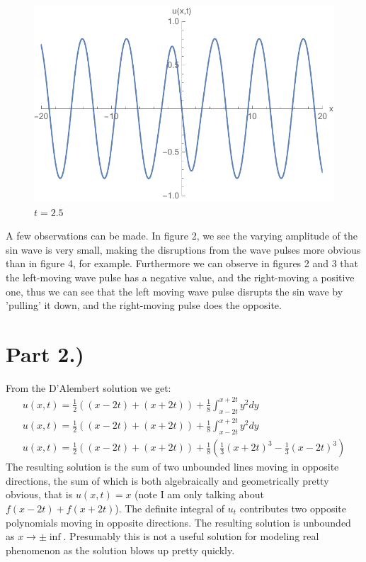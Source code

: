 \documentclass{article}
\begin{document}
\begin{figure}[H]
\begin{minipage}[b]{0.49\textwidth}
  \end{minipage}
    \hfill
  \begin{minipage}[b]{0.49\textwidth}
    \includegraphics[width=\textwidth]{plot_t_25.pdf}
    \caption{$t = 2.5$}

  \end{minipage}
\end{figure}
A few observations can be made. In figure 2, we see the varying amplitude of the sin wave is very small, making the disruptions from the wave pulses more obvious than in figure 4, for example. Furthermore we can observe in figures 2 and 3 that the left-moving wave pulse has a negative value, and the right-moving a positive one, thus we can see that the left moving wave pulse disrupts the sin wave by 'pulling' it down, and the right-moving pulse does the opposite.
\section*{Part 2.)}
From the D'Alembert solution we get:
\begin{equation}
\begin{aligned}
u(x,t) = \frac{1}{2} ( (x - 2t) + (x + 2t)) + \frac{1}{8} \int_{x-2t}^{x+2t} y^2dy\\
u(x,t) = \frac{1}{2} ( (x - 2t) + (x + 2t)) + \frac{1}{8} \int_{x-2t}^{x+2t} y^2dy\\
u(x,t) = \frac{1}{2} ( (x - 2t) + (x + 2t)) + \frac{1}{8}(\frac{1}{3}(x+2t)^3 - \frac{1}{3}(x-2t)^3)
\end{aligned}
\end{equation}
The resulting solution is the sum of two unbounded lines moving in opposite directions, the sum of which is both algebraically and geometrically pretty obvious, that is $u(x, t) = x$ (note I am only talking about $f(x-2t) + f(x+2t)$). The definite integral of $u_t$ contributes two opposite polynomials moving in opposite directions. The resulting solution is unbounded as $x \to \pm \inf$. Presumably this is not a useful solution for modeling real phenomenon as the solution blows up pretty quickly.
\end{document}
